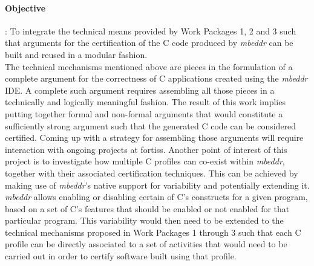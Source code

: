 \paragraph{\textbf{Objective}}: To integrate the technical means provided by
Work Packages 1, 2 and 3 such that arguments for the certification of the C code
produced by \emph{mbeddr} can be built and reused in a modular
fashion.\vspace{.2cm}\\
The technical mechanisms mentioned above are pieces in the formulation of a
complete argument for the correctness of C applications created using the
\emph{mbeddr} IDE.
A complete such argument requires assembling all those pieces in a technically and logically meaningful fashion. The result of
this work implies putting together formal and non-formal arguments that would
constitute a sufficiently strong argument such that the generated C code can be
considered certified.
Coming up with a strategy for assembling those arguments will require
interaction with ongoing projects at fortiss. Another point of interest of
this project is to investigate how multiple C profiles can co-exist within
\emph{mbeddr}, together with their associated certification techniques. This can
be achieved by making use of \emph{mbeddr}'s native support for variability and
potentially extending it. \emph{mbeddr} allows enabling or disabling certain of
C's constructs for a given program, based on a set of C's features that should
be enabled or not enabled for that particular program.
This variability would then need to be extended to the technical mechanisms
proposed in Work Packages 1 through 3 such that each C profile can be directly
associated to a set of activities that would need to be carried out in order to
certify software built using that profile.

